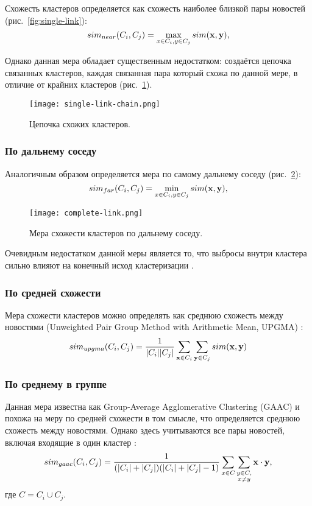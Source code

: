 Схожесть кластеров определяется как схожесть наиболее близкой пары новостей (рис.~\ref{fig:single-link}):
\begin{equation}
    sim_{near}(C_i,C_j)=\max_{x\in C_i,y\in C_j}sim(\boldsymbol{\mathbf{x}},\boldsymbol{\mathbf{y}}),
\end{equation}

Однако данная мера обладает существенным недостатком: создаётся цепочка связанных кластеров, каждая связанная пара который схожа по данной мере, в отличие от крайних кластеров (рис.~\ref{fig:single-link-chain}).
\begin{figure}[h]
    \centering
    \texttt{[image: single-link-chain.png]}
    \caption{Цепочка схожих кластеров.}
    \label{fig:single-link-chain}
\end{figure}

\subsubsection{По дальнему соседу}
Аналогичным образом определяется мера по самому дальнему соседу (рис.~\ref{fig:complete-link}):
\begin{equation}
    sim_{far}(C_i,C_j)=\min_{x\in C_i,y\in C_j}sim(\boldsymbol{\mathbf{x}},\boldsymbol{\mathbf{y}}),
\end{equation}

\begin{figure}[h]
    \centering
    \texttt{[image: complete-link.png]}
    \caption{Мера схожести кластеров по дальнему соседу.}
    \label{fig:complete-link}
\end{figure}

Очевидным недостатком данной меры является то, что выбросы внутри кластера сильно влияют на конечный исход кластеризации \cite{zhao05}.

\subsubsection{По средней схожести}
Мера схожести кластеров можно определять как среднюю схожесть между новостями (Unweighted Pair Group Method with Arithmetic Mean, UPGMA) \cite{lonnberg13}:
\begin{equation} \label{eq:upgma}
    sim_{upgma}(C_i,C_j)=\frac{1}{|C_i||C_j|}\sum_{\mathbf{x}\in C_i}\sum_{\mathbf{y}\in C_j}sim(\boldsymbol{\mathbf{x}},\boldsymbol{\mathbf{y}})
\end{equation}

\subsubsection{По среднему в группе}
Данная мера известна как Group-Average Agglomerative Clustering (GAAC) и похожа на меру по средней схожести в том смысле, что определяется среднюю схожесть между новостями. Однако здесь учитываются все пары новостей, включая входящие в один кластер \cite{zhao05}:
\begin{equation}
    sim_{gaac}(C_i,C_j)=\frac{1}{(|C_i|+|C_j|)(|C_i|+|C_j|-1)}\sum_{x\in C}\sum_{\substack{y\in C,\\x\neq y}}\boldsymbol{\mathbf{x}}\cdot\boldsymbol{\mathbf{y}},
\end{equation}
где $C=C_i\cup C_j$.

